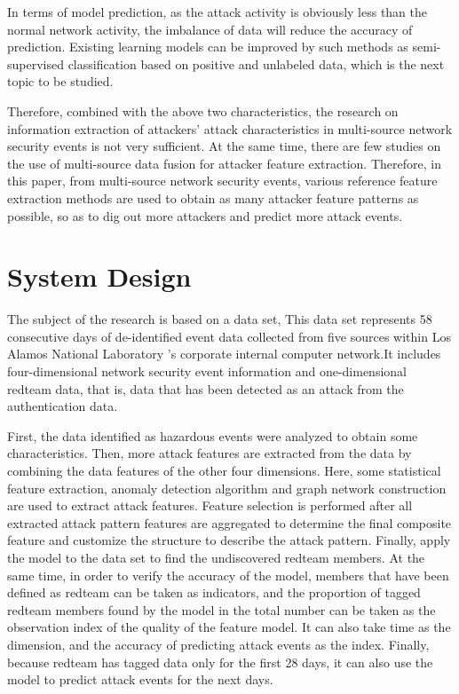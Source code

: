 \documentclass[12pt,journal,draftcls,doublespace, letterpaper,onecolumn]{IEEEtran}
\begin{document}
In terms of model prediction, as the attack activity is obviously less than the normal network activity, the imbalance of data will reduce the accuracy of prediction. Existing learning models can be improved by such methods as semi-supervised classification based on positive and unlabeled data, which is the next topic to be studied.

Therefore, combined with the above two characteristics, the research on information extraction of attackers' attack characteristics in multi-source network security events is not very sufficient. At the same time, there are few studies on the use of multi-source data fusion for attacker feature extraction. Therefore, in this paper, from multi-source network security events, various reference feature extraction methods are used to obtain as many attacker feature patterns as possible, so as to dig out more attackers and predict more attack events.

\section{System Design} \label{model}

The subject of the research is based on a data set, This data set represents 58 consecutive days of de-identified event data collected from five sources within Los Alamos National Laboratory 's corporate internal computer network.It includes four-dimensional network security event information and one-dimensional redteam data, that is, data that has been detected as an attack from the authentication data.

First, the data identified as hazardous events were analyzed to obtain some characteristics. Then, more attack features are extracted from the data by combining the data features of the other four dimensions. Here, some statistical feature extraction, anomaly detection algorithm and graph network construction are used to extract attack features. Feature selection is performed after all extracted attack pattern features are aggregated to determine the final composite feature and customize the structure to describe the attack pattern. Finally, apply the model to the data set to find the undiscovered redteam members. At the same time, in order to verify the accuracy of the model, members that have been defined as redteam can be taken as indicators, and the proportion of tagged redteam members found by the model in the total number can be taken as the observation index of the quality of the feature model. It can also take time as the dimension, and the accuracy of predicting attack events as the index. Finally, because redteam has tagged data only for the first 28 days, it can also use the model to predict attack events for the next days.
\end{document}
